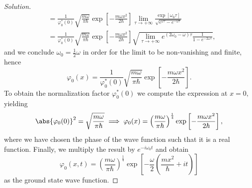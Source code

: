 \begin{proof}[Solution]
\begin{align*}
                   &= \frac{1}{\varphi_0^*(0)}\sqrt{\frac{m \omega}{\pi \hbar}} \exp\left[-\frac{m \omega x^2}{2\hbar}\right] \lim_{\tau \to +\infty}{\frac{\exp\left[\omega_0 \tau\right]}{\sqrt{e^{\omega \tau} - e^{-\omega \tau}}}}\\
                   &= \frac{1}{\varphi_0^*(0)}\sqrt{\frac{m \omega}{\pi \hbar}} \exp\left[-\frac{m \omega x^2}{2\hbar}\right] \sqrt{\lim_{\tau \to +\infty}{e^{(2 \omega_0 - \omega)\tau}\frac{1}{1 - e^{-2\omega \tau}}}},
   \end{align*}
   and we conclude \(\omega_0 = \frac12 \omega\) in order for the limit to be non-vanishing and finite, hence
   \begin{equation*}
      \varphi_0(x) = \frac{1}{\varphi_0^*(0)} \sqrt{\frac{m \omega}{\pi \hbar}} \exp\left[-\frac{m\omega x^2}{2 \hbar}\right].
   \end{equation*}
   To obtain the normalization factor \(\varphi_0^*(0)\) we compute the expression at \(x = 0,\) yielding
   \begin{equation*}
      \abs{\varphi_0(0)}^2 = \sqrt{\frac{m \omega}{\pi \hbar}} \implies \varphi_0(x) = \left(\frac{m \omega}{\pi \hbar}\right)^{\frac14} \exp\left[- \frac{m \omega x^2}{2 \hbar}\right],
   \end{equation*}
   where we have chosen the phase of the wave function such that it is a real function. Finally, we multiply the result by \(e^{-i \omega_0 t}\) and obtain
   \begin{equation*}
      \varphi_0(x, t) = \left(\frac{m \omega}{\pi \hbar}\right)^{\frac14} \exp\left[-\frac{\omega}{2}\left(\frac{m x^2}{\hbar} + i t\right)\right]
   \end{equation*}
   as the ground state wave function.
\end{proof}
